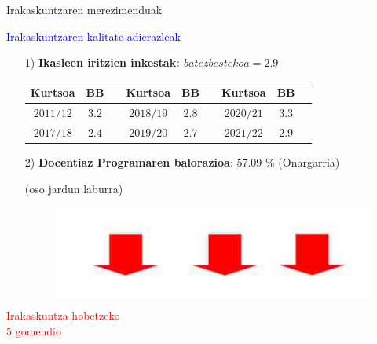 \documentclass[
 10pt,%
 compress,%
 t,       %
 xcolor=svgnames
]{beamer}
\theoremstyle{definition} \newtheorem{definicion}{Definicion}[section]
\theoremstyle{propiedades} \newtheorem{propiedades}{Propiedades}[section]
\begin{document}
\begin{frame}{Irakaskuntzaren merezimenduak} 


\medskip
\hspace*{2.cm}\textcolor{blue}{Irakaskuntzaren kalitate-adierazleak}

\medskip

\begin{itemize}
%
\small


\medskip
\item[1)] \textbf{Ikasleen iritzien inkestak: $batezbestekoa=2.9$}
%

\bigskip

\footnotesize
\begin{center}
\begin{tabular}{ c c c c c c c c c}
 Kurtsoa & BB & &  Kurtsoa & BB & &  Kurtsoa & BB   \\ 
 \hline 
 $2011/12$ & $3.2$ &\qquad   & $2018/19$ & $2.8$ & \qquad &  $2020/21$ & $3.3$  \\  
 $2017/18$ & $2.4$ & \qquad  & $2019/20$ & $2.7$ & \qquad &  $2021/22$ & $2.9$   \\ 
 \hline   
\end{tabular}
\end{center}
%

\bigskip


\small

\item[2)] \textbf{Docentiaz Programaren balorazioa}: 57.09 \% (Onargarria)


(oso jardun laburra)

\begin{figure}
\begin{minipage}{.6\textwidth}
\colorbox{white}  {\includegraphics[width=0.6\linewidth]{Flechas}}
\end{minipage}
\end{figure}
\end{itemize}
%
%
\normalsize
\hspace*{3.cm}\textcolor{red}{Irakaskuntza hobetzeko}\\
\hspace*{3.7cm}\textcolor{red}{5 gomendio}
%


\end{frame}
\end{document}
